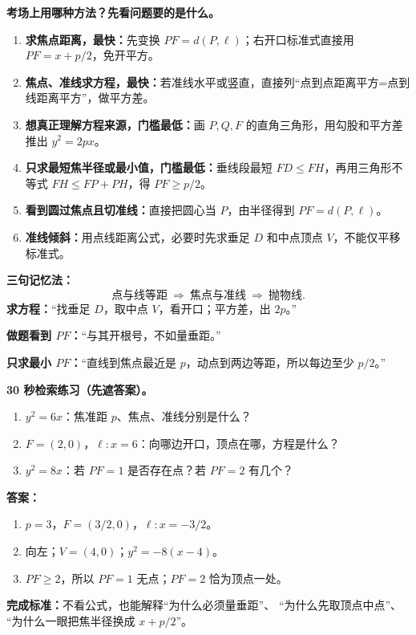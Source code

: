 \begin{summarybox}
\textbf{考场上用哪种方法？先看问题要的是什么。}
\begin{enumerate}[leftmargin=*]
\item \textbf{求焦点距离，最快：}先变换 $PF=d(P,\ell)$；右开口标准式直接用 $PF=x+p/2$，免开平方。
\item \textbf{焦点、准线求方程，最快：}若准线水平或竖直，直接列“点到点距离平方=点到线距离平方”，做平方差。
\item \textbf{想真正理解方程来源，门槛最低：}画 $P,Q,F$ 的直角三角形，用勾股和平方差推出 $y^2=2px$。
\item \textbf{只求最短焦半径或最小值，门槛最低：}垂线段最短 $FD\le FH$，再用三角形不等式 $FH\le FP+PH$，得 $PF\ge p/2$。
\item \textbf{看到圆过焦点且切准线：}直接把圆心当 $P$，由半径得到 $PF=d(P,\ell)$。
\item \textbf{准线倾斜：}用点线距离公式，必要时先求垂足 $D$ 和中点顶点 $V$，不能仅平移标准式。
\end{enumerate}
\end{summarybox}
\clearpage
\begin{summarybox}
\textbf{三句记忆法：}
\[
\boxed{\text{点与线等距}}\ \Longrightarrow\
\boxed{\text{焦点与准线}}\ \Longrightarrow\
\boxed{\text{抛物线}}.
\]
\textbf{求方程：}“找垂足 $D$，取中点 $V$，看开口；平方差，出 $2p$。”

\textbf{做题看到 $PF$：}“与其开根号，不如量垂距。”

\textbf{只求最小 $PF$：}“直线到焦点最近是 $p$，动点到两边等距，所以每边至少 $p/2$。”

\medskip
\textbf{30 秒检索练习（先遮答案）。}
\begin{enumerate}[leftmargin=*]
\item $y^2=6x$：焦准距 $p$、焦点、准线分别是什么？
\item $F=(2,0)$，$\ell:x=6$：向哪边开口，顶点在哪，方程是什么？
\item $y^2=8x$：若 $PF=1$ 是否存在点？若 $PF=2$ 有几个？
\end{enumerate}
\textbf{答案：}
\begin{enumerate}[leftmargin=*]
\item $p=3$，$F=(3/2,0)$，$\ell:x=-3/2$。
\item 向左；$V=(4,0)$；$y^2=-8(x-4)$。
\item $PF\ge2$，所以 $PF=1$ 无点；$PF=2$ 恰为顶点一处。
\end{enumerate}

\textbf{完成标准：}不看公式，也能解释“为什么必须量垂距”、
“为什么先取顶点中点”、
“为什么一眼把焦半径换成 $x+p/2$”。
\end{summarybox}
